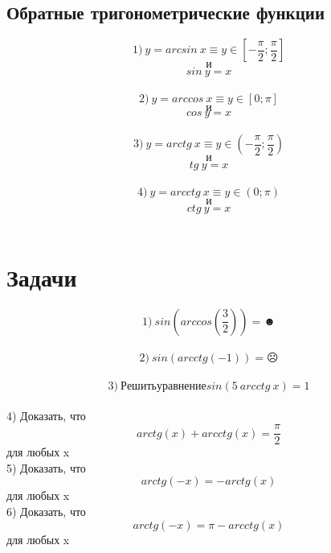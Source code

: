 \documentclass{article}
\begin{document}
 \begin{center}
     \section*{Обратные тригонометрические функции}
\end{center}
    \huge $$ 1) \ y = arcsin \ x \equiv y \in [-\frac{\pi }{2};\frac{\pi }{2}]$$ $$\text{и}$$ $$sin \ y = x$$\\ [2mm]
   $$ 2) \ y = arccos \ x \equiv y \in [0;\pi]$$ $$\text{и} $$ $$cos \ y = x$$\\[2mm]
    $$ 3) \ y = arctg \ x \equiv y \in (-\frac{\pi }{2};\frac{\pi }{2})$$ $$\text{и}$$ $$ tg \ y = x$$\\ [2mm]
    $$ 4) \ y = arcctg \ x \equiv y \in (0;\pi)$$ $$\text{и} $$ $$ctg \ y = x$$\\[2mm]

\section*{Задачи }
\huge$$ 1) \ sin(arccos\left(\frac{3}{2}\right)) = \blacksmiley$$\\[2mm]
\huge$$2) \ sin(arcctg(-1)) = \frownie$$\\[2mm]
\huge$$3) \ Решить уравнение sin(5\ arcctg \ x) = 1$$\\[2mm]
 4) Доказать, что \huge$$ arctg(x) +  arcctg (x) = \frac{\pi}{2}$$  для любых x\\[2mm]
 5) Доказать, что \huge$$ arctg(- x) = -arctg(x)$$  для любых x \\[2mm]
 6) Доказать, что \huge$$ arctg(-x) = \pi - arcctg(x)$$  для любых x 
\end{document}
